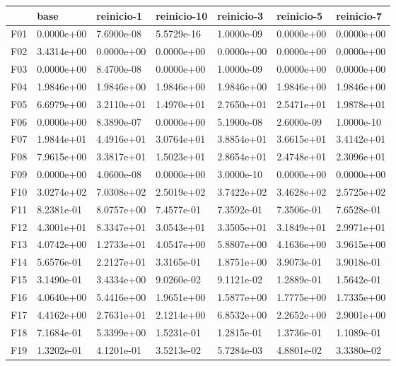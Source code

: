 \begin{tabular}{lllllll}
\toprule
{} &        base &  reinicio-1 & reinicio-10 &  reinicio-3 &  reinicio-5 &  reinicio-7 \\
\midrule
F01  &  0.0000e+00 &  7.6900e-08 &  5.5729e-16 &  1.0000e-09 &  0.0000e+00 &  0.0000e+00 \\
F02  &  3.4314e+00 &  0.0000e+00 &  0.0000e+00 &  0.0000e+00 &  0.0000e+00 &  0.0000e+00 \\
F03  &  0.0000e+00 &  8.4700e-08 &  0.0000e+00 &  1.0000e-09 &  0.0000e+00 &  0.0000e+00 \\
F04  &  1.9846e+00 &  1.9846e+00 &  1.9846e+00 &  1.9846e+00 &  1.9846e+00 &  1.9846e+00 \\
F05  &  6.6979e+00 &  3.2110e+01 &  1.4970e+01 &  2.7650e+01 &  2.5471e+01 &  1.9878e+01 \\
F06  &  0.0000e+00 &  8.3890e-07 &  0.0000e+00 &  5.1900e-08 &  2.6000e-09 &  1.0000e-10 \\
F07  &  1.9844e+01 &  4.4916e+01 &  3.0764e+01 &  3.8854e+01 &  3.6615e+01 &  3.4142e+01 \\
F08  &  7.9615e+00 &  3.3817e+01 &  1.5023e+01 &  2.8654e+01 &  2.4748e+01 &  2.3096e+01 \\
F09  &  0.0000e+00 &  4.0600e-08 &  0.0000e+00 &  3.0000e-10 &  0.0000e+00 &  0.0000e+00 \\
F10  &  3.0274e+02 &  7.0308e+02 &  2.5019e+02 &  3.7422e+02 &  3.4628e+02 &  2.5725e+02 \\
F11  &  8.2381e-01 &  8.0757e+00 &  7.4577e-01 &  7.3592e-01 &  7.3506e-01 &  7.6528e-01 \\
F12  &  4.3001e+01 &  8.3347e+01 &  3.0543e+01 &  3.3505e+01 &  3.1849e+01 &  2.9971e+01 \\
F13  &  4.0742e+00 &  1.2733e+01 &  4.0547e+00 &  5.8807e+00 &  4.1636e+00 &  3.9615e+00 \\
F14  &  5.6576e-01 &  2.2127e+01 &  3.3165e-01 &  1.8751e+00 &  3.9073e-01 &  3.9018e-01 \\
F15  &  3.1490e-01 &  3.4334e+00 &  9.0260e-02 &  9.1121e-02 &  1.2889e-01 &  1.5642e-01 \\
F16  &  4.0640e+00 &  5.4416e+00 &  1.9651e+00 &  1.5877e+00 &  1.7775e+00 &  1.7335e+00 \\
F17  &  4.4162e+00 &  2.7631e+01 &  2.1214e+00 &  6.8532e+00 &  2.2652e+00 &  2.9001e+00 \\
F18  &  7.1684e-01 &  5.3399e+00 &  1.5231e-01 &  1.2815e-01 &  1.3736e-01 &  1.1089e-01 \\
F19  &  1.3202e-01 &  4.1201e-01 &  3.5213e-02 &  5.7284e-03 &  4.8801e-02 &  3.3380e-02 \\

\end{tabular}
